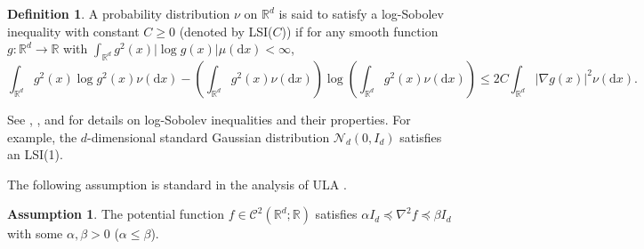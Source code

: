 \documentclass[12pt,reqno]{amsart}
\theoremstyle{remark}
\theoremstyle{definition}
\newtheorem{definition}{Definition}
\newtheorem{assumption}{Assumption}
\newcommand{\calC}{\mathcal{C}}
\newcommand{\calN}{\mathcal{N}}
\newcommand{\R}{\mathbb{R}}
\newcommand{\diff}{\mathrm{d}}
\begin{document}
\begin{definition}
    A probability distribution $\nu$ on $\R^{d}$ is said to satisfy a log-Sobolev inequality with constant $C\ge 0$ (denoted by LSI($C$)) if for any smooth function $g:\R^{d}\to\R$ with $\int_{\R^{d}}g^{2}(x)|\log g(x)|\mu(\diff x)<\infty$,
    \begin{equation*}
        \int_{\R^{d}}g^{2}(x)\log g^{2}(x)\nu(\diff x)-\left(\int_{\R^{d}}g^{2}(x)\nu(\diff x)\right)\log\left(\int_{\R^{d}}g^{2}(x)\nu(\diff x)\right)\le 2C\int_{\R^{d}}|\nabla g(x)|^{2}\nu(\diff x).
    \end{equation*}
\end{definition}
See \citet{bakry2014analysis}, \citet{vanhandel2016probability}, and \citet{chewi2023log} for details on log-Sobolev inequalities and their properties.
For example, the $d$-dimensional standard Gaussian distribution $\calN_{d}(0,I_{d})$ satisfies an LSI(1).

The following assumption is standard in the analysis of ULA \citep[e.g.,][]{durmus2019high}.
\begin{assumption}\label{asmp:potential}
    The potential function $f\in\calC^{2}(\R^{d};\R)$ satisfies $\alpha I_{d}\preceq \nabla^{2}f \preceq \beta I_{d}$ with some $\alpha,\beta>0$ ($\alpha\le \beta$).
\end{assumption}
\end{document}
